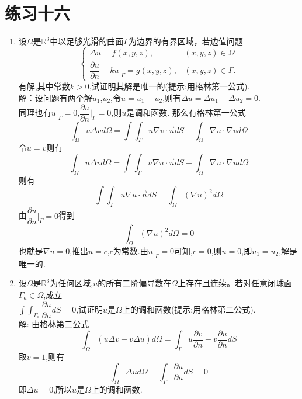 \documentclass[11pt]{article}
\begin{document}
\section*{练习十六}
    \begin{enumerate}
    \item 设$\Omega$是$\mathbb{R}^3$中以足够光滑的曲面$\Gamma$为边界的有界区域，若边值问题
       \begin{equation*}
    \left\{
     \begin{array}{lr}
     \Delta u = f(x,y,z),&(x,y,z)\in\Omega \\
     \dfrac{\partial u}{\partial n}+ku|_{\Gamma} =g(x,y,z),&(x,y,z)\in\Gamma.
     \end{array}
    \right.
    \end{equation*}
    有解,其中常数$k>0$,试证明其解是唯一的(提示:用格林第一公式).\\
        解：设问题有两个解$u_1$,$u_2$,令$u=u_1-u_2$,则有$\Delta u=\Delta u_1 - \Delta u_2=0$.\\
    同理也有$u|_{\Gamma}=0$,$\dfrac{\partial u}{\partial n}|_{\Gamma}=0$,则$u$是调和函数.
    那么有格林第一公式\[\displaystyle\int_{\Omega}u\Delta vd\Omega = \displaystyle\int\int_{\Gamma}u\nabla v\cdot\overrightarrow{n}dS-\displaystyle\int_{\Omega}\nabla u\cdot\nabla vd\Omega\]
    令$u=v$则有\[\displaystyle\int_{\Omega}u\Delta vd\Omega = \displaystyle\int\int_{\Gamma}u\nabla u\cdot\overrightarrow{n}dS-\displaystyle\int_{\Omega}\nabla u\cdot\nabla ud\Omega\]
    则有\[\displaystyle\int\int_{\Gamma}u\nabla u\cdot\overrightarrow{n}dS=\displaystyle\int_{\Omega}(\nabla u)^2 d\Omega\]
    由$\dfrac{\partial u}{\partial n}|_{\Gamma}=0$得到\[\displaystyle\int_{\Omega}(\nabla u)^2 d\Omega=0\]
    也就是$\nabla u=0$,推出$u=c$,$c$为常数.由$u|_{\Gamma}=0$可知,$c=0$,则$u=0$,即$u_1=u_2$,解是唯一的.


    \item 设$\Omega$是$\mathbb{R}^3$为任何区域,$u$的所有二阶偏导数在$\Omega$上存在且连续。若对任意闭球面$\Gamma_a\in\Omega$,成立\\[8pt]
    $\displaystyle\int\int_{\Gamma_a}\dfrac{\partial u}{\partial n}dS=0$,试证明$u$是$\Omega$上的调和函数(提示:用格林第二公式).\\[8pt]
     解: 由格林第二公式\[\displaystyle\int_{\Omega}(u\Delta v-v\Delta u)d\Omega=\displaystyle\int_{\Gamma}u\dfrac{\partial v}{\partial n}-v\dfrac{\partial u}{\partial n}dS\]
    取$v=1$,则有\[\displaystyle\int_{\Omega}\Delta ud\Omega=\displaystyle\int_{\Gamma}\dfrac{\partial u}{\partial n}dS=0\]
    即$\Delta u =0$,所以$u$是$\Omega$上的调和函数.




\end{enumerate}
\end{document}
